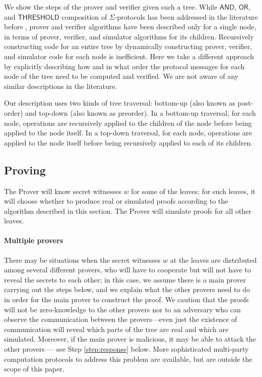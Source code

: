 \documentclass[11pt]{article}
\newcommand{\andnode}{\ensuremath{\mathsf{AND}}}
\newcommand{\ornode}{\ensuremath{\mathsf{OR}}}
\newcommand{\tnode}{\ensuremath{\mathsf{THRESHOLD}}}
\begin{document}
We show the steps of the prover and verifier given such a tree. While $\andnode$, $\ornode$, and $\tnode$ composition of $\Sigma$-protocols has been addressed in the literature before \cite{CDS94}, prover and verifier algorithms have been described only for a single node, in terms of prover, verifier, and simulator algorithms for its children. Recursively constructing code for an entire tree by dynamically constructing prover, verifier, and simulator code for each node is inefficient. Here we take a different approach by explicitly describing how and in what order the protocol messages for each node of the tree need to be computed and verified. We are not aware of any similar descriptions in the literature.

Our description uses two kinds of tree traversal: bottom-up (also known as post-order) and top-down (also known as preorder). In a bottom-up traversal, for each node, operations are recursively applied to the children of the node before being applied to the node itself. In a top-down traversal, for each node, operations are applied to the node itself before being recursively applied to each of its children.

\subsection{Proving}
\label{sec:proving}

The Prover will know secret witnesses $w$ for some of the leaves; for such leaves, it will choose whether to produce real or simulated proofs according to the algorithm described in this section. The Prover will simulate proofs for all other leaves. 

\paragraph{Multiple provers} There may be situations when the secret witnesses $w$ at the leaves are distributed among several different provers, who will have to cooperate but will not have to reveal the secrets to each other; in this case, we assume there is a main prover carrying out the steps below, and we explain what the other provers need to do in order for the main prover to construct the proof. We caution that the proofs will not be zero-knowledge to the other provers nor to an adversary who can observe the communication between the provers---even just the existence of communication will reveal which parts of the tree are real and which are simulated. Moreover, if the main prover is malicious, it may be able to attack the other provers --- see Step \ref{step:response} below. More sophisticated multi-party computation protocols to address this problem are available, but are outside the scope of this paper.
\end{document}
